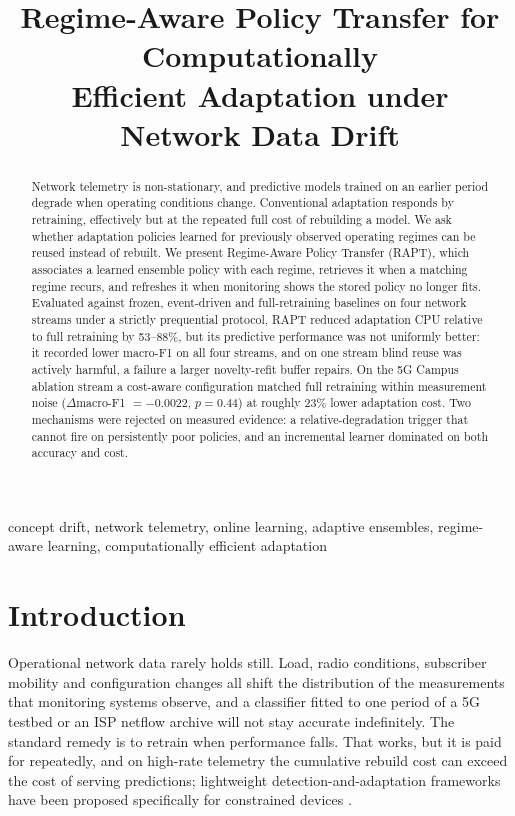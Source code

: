\documentclass[conference]{IEEEtran}
\begin{document}
\title{Regime-Aware Policy Transfer for Computationally\\ Efficient Adaptation under Network Data Drift}

\author{
}

\maketitle

\begin{abstract}
Network telemetry is non-stationary, and predictive models trained on an earlier
period degrade when operating conditions change. Conventional adaptation responds by
retraining, effectively but at the repeated full cost of rebuilding a model. We ask
whether adaptation policies learned for previously observed operating regimes can be
reused instead of rebuilt. We present Regime-Aware Policy Transfer (RAPT), which
associates a learned ensemble policy with each regime, retrieves it when a matching
regime recurs, and refreshes it when monitoring shows the stored policy no longer
fits. Evaluated against frozen, event-driven and full-retraining baselines on four
network streams under a strictly prequential protocol, RAPT reduced adaptation CPU
relative to full retraining by 53--88\%, but its predictive performance was not
uniformly better: it recorded lower macro-F1 on all four streams, and on one stream
blind reuse was actively harmful, a failure a larger novelty-refit buffer repairs. On
the 5G Campus ablation stream a cost-aware configuration matched full retraining
within measurement noise ($\Delta$macro-F1 $=-0.0022$, $p=0.44$) at roughly 23\% lower
adaptation cost. Two
mechanisms were rejected on measured evidence: a relative-degradation trigger that
cannot fire on persistently poor policies, and an incremental learner dominated on
both accuracy and cost.
\end{abstract}

\begin{IEEEkeywords}
concept drift, network telemetry, online learning, adaptive ensembles,
regime-aware learning, computationally efficient adaptation
\end{IEEEkeywords}

\section{Introduction}

Operational network data rarely holds still. Load, radio conditions, subscriber
mobility and configuration changes all shift the distribution of the measurements
that monitoring systems observe, and a classifier fitted to one period of a 5G
testbed or an ISP netflow archive will not stay accurate indefinitely. The standard
remedy is to retrain when performance falls. That works, but it is paid for
repeatedly, and on high-rate telemetry the cumulative rebuild cost can exceed the
cost of serving predictions; lightweight detection-and-adaptation frameworks have
been proposed specifically for constrained devices \cite{9427288}.
\end{document}
